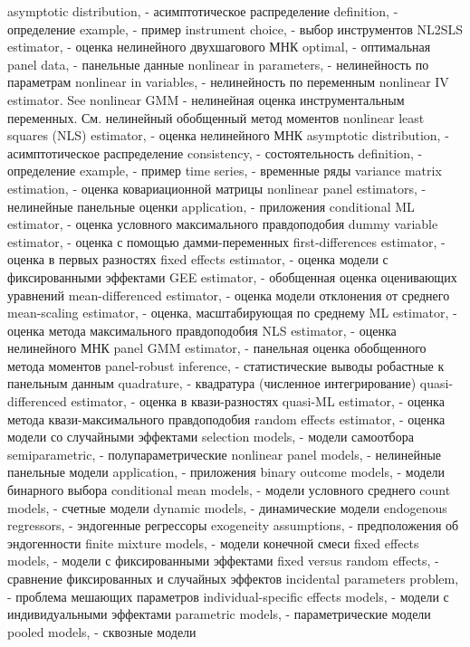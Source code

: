 asymptotic distribution, - асимптотическое распределение
definition, - определение
example, - пример
instrument choice, - выбор инструментов
NL2SLS estimator, - оценка нелинейного двухшагового МНК
optimal, - оптимальная
panel data, - панельные данные
nonlinear in parameters, - нелинейность по параметрам
nonlinear in variables, - нелинейность по переменным
nonlinear IV estimator. See nonlinear GMM - нелинейная оценка инструментальным переменных. См. нелинейный обобщенный метод моментов
nonlinear least squares (NLS) estimator, - оценка нелинейного МНК
asymptotic distribution, - асимптотическое распределение
consistency, - состоятельность
definition, - определение
example, - пример
time series, - временные ряды
variance matrix estimation, - оценка ковариационной матрицы
nonlinear panel estimators, - нелинейные панельные оценки
application, - приложения
conditional ML estimator, - оценка условного максимального правдоподобия
dummy variable estimator, - оценка с помощью дамми-переменных
first-differences estimator, - оценка в первых разностях
fixed effects estimator, - оценка модели с фиксированными эффектами
GEE estimator, - обобщенная оценка оценивающих уравнений
mean-differenced estimator, - оценка модели отклонения от среднего
mean-scaling estimator, - оценка, масштабирующая по среднему
ML estimator, - оценка метода максимального правдоподобия
NLS estimator, - оценка нелинейного МНК
panel GMM estimator, - панельная оценка обобщенного метода моментов
panel-robust inference, - статистические выводы робастные к панельным данным
quadrature, - квадратура (численное интегрирование)
quasi-differenced estimator, - оценка в квази-разностях
quasi-ML estimator, - оценка метода квази-максимального правдоподобия
random effects estimator, - оценка модели со случайными эффектами
selection models, - модели самоотбора
semiparametric, - полупараметрические
nonlinear panel models, - нелинейные панельные модели
application, - приложения
binary outcome models, - модели бинарного выбора
conditional mean models, - модели условного среднего
count models, - счетные модели
dynamic models, - динамические модели
endogenous regressors, - эндогенные регрессоры
exogeneity assumptions, - предположения об эндогенности
finite mixture models, - модели конечной смеси
fixed effects models, - модели с фиксированными эффектами
fixed versus random effects, - сравнение фиксированных и случайных эффектов
incidental parameters problem, - проблема мешающих параметров
individual-specific effects models, - модели с индивидуальными эффектами
parametric models, - параметрические модели
pooled models, - сквозные модели
